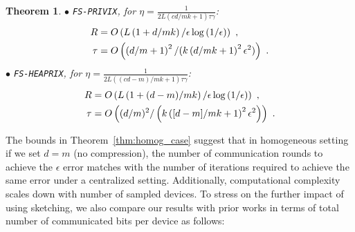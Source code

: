 \documentclass{article}
\newtheorem{theorem}{Theorem}
\begin{document}
\begin{theorem}
\noindent $\bullet$ \texttt{FS-PRIVIX}, for $\eta=\frac{1}{2L(cd/mk+1)\tau\gamma}$:    
\begin{equation}\notag
\begin{split}
R& =O\left(L\left(1+d/mk\right)/\epsilon\log\left(1/\epsilon \right)\right)\ ,\\
\tau&=O\left(\left(d/m+1\right)^2/(k\left(d/m k+1\right)^2\epsilon^2)\right)\ .
 \end{split}
\end{equation}
\noindent $\bullet$ \texttt{FS-HEAPRIX}, for $\eta=\frac{1}{2L\left((cd-m)/mk+1\right)\tau\gamma}$:   
\begin{equation}\notag
\begin{split}
R& =O\left(L\left(1+(d-m)/mk\right)/\epsilon\log\left(1/\epsilon \right)\right)\ ,\\
 \tau&=O\left((d/m)^2/\left(k\left([d-m]/mk+1\right)^2\epsilon^2\right)\right)\ .
 \end{split}
\end{equation}
\end{theorem}




The bounds in Theorem~\ref{thm:homog_case} suggest that in homogeneous setting if we set $d=m$ (no compression), the number of communication rounds to achieve the $\epsilon$ error matches with the number of iterations required to achieve the same error under a centralized setting. 
Additionally, computational complexity scales down with number of sampled devices. 
To stress on the further impact of using sketching, we also compare our results with prior works in terms of total number of communicated bits per device as follows:
\end{document}
